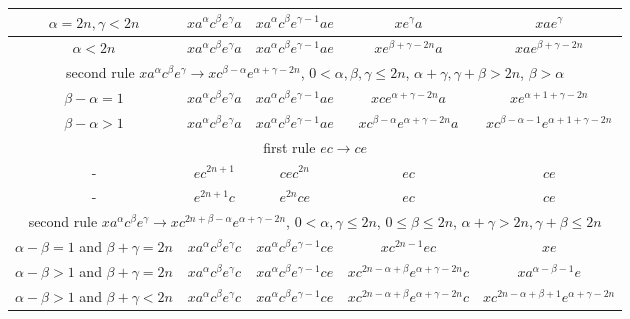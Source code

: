 \documentclass{article}
\theoremstyle{definition}
\begin{document}
\begin{center}
\begin{tabular}{|c|c|c|c|c|}
\hline
$\alpha = 2n, \gamma < 2n$ & $x a^\alpha c^\beta e^\gamma a $ & $x a^{\alpha} c^\beta e^{\gamma-1} a e$ & $x  e^{\gamma} a$ & $x a e^\gamma$ \\
\hline
$\alpha < 2n$ & $x a^\alpha c^\beta e^\gamma a $ & $x a^{\alpha} c^\beta e^{\gamma-1} a e$ & $x  e^{\beta+\gamma - 2n} a$ & $x a e^{\beta+\gamma - 2n}$ \\
\hline
\multicolumn{5}{|c|}{second rule $x a^\alpha c^\beta e^\gamma \rightarrow x c^{\beta - \alpha} e^{\alpha+\gamma -2n}$,  $0< \alpha,\beta, \gamma \le 2n$, $\alpha+\gamma, \gamma+\beta > 2n$, $\beta > \alpha$}\\
\hline
$\beta-\alpha = 1$ & $x a^\alpha c^\beta e^\gamma a$ & $x a^{\alpha} c^\beta e^{\gamma-1} a e$ & $x c e^{\alpha+\gamma -2n} a$ & $x  e^{\alpha+1+\gamma -2n}$ \\
\hline
$\beta-\alpha > 1$ & $x a^\alpha c^\beta e^\gamma a$ & $x a^{\alpha} c^\beta e^{\gamma-1} a e$ & $x c^{\beta-\alpha} e^{\alpha+\gamma -2n} a$ & $x c^{\beta-\alpha-1} e^{\alpha+1+\gamma -2n}$ \\
\hline
\hline
\multicolumn{5}{|c|}{first rule $ec \rightarrow ce$}\\
\hline
\hline
-& $ ec^{2n+1} $ &  $  cec^{2n}  $ &   $ ec  $ &  $ ce $ \\
\hline
-& $ e^{2n+1} c $ &  $  e^{2n} c e $ &   $ ec  $ &  $ ce $ \\
\hline
\multicolumn{5}{|c|}{second rule $x a^\alpha c^\beta e^\gamma \rightarrow x c^{2n+\beta -\alpha} e^{\alpha+\gamma -2n}$,  $0< \alpha, \gamma \le 2n$, $0 \le \beta \le 2n$, $\alpha+\gamma > 2n, \gamma+\beta \le 2n$}\\
\hline
$\alpha -\beta =1$ and $\beta+\gamma = 2n$ & $x a^\alpha c^\beta e^\gamma c$ & $x a^{\alpha} c^\beta e^{\gamma-1} c e$ & $x c^{2n-1} e c$ & $x  e$ \\
\hline
$\alpha -\beta >1$ and $\beta+\gamma = 2n$ & $x a^\alpha c^\beta e^\gamma c$ & $x a^{\alpha} c^\beta e^{\gamma-1} c e$ & $x c^{2n-\alpha+\beta} e^{\alpha+\gamma-2n} c$ & $x a^{\alpha - \beta-1} e $ \\
\hline
$\alpha -\beta >1$ and $\beta+\gamma < 2n$ & $x a^\alpha c^\beta e^\gamma c$ & $x a^{\alpha} c^\beta e^{\gamma-1} c e$ & $x c^{2n-\alpha+\beta} e^{\alpha+\gamma-2n} c$ & $x c^{2n-\alpha+\beta+1}  e^{\alpha+\gamma-2n}$ \\
\hline
\end{tabular}
\end{center}
\end{document}

